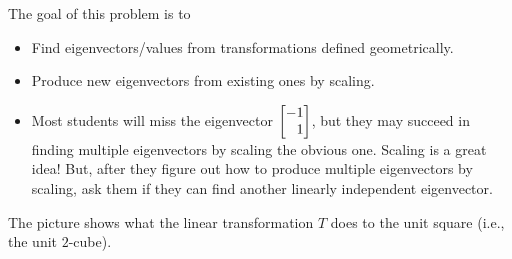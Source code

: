 	\question
	\begin{annotation}
		\begin{goals}

			The goal of this problem is to
			\begin{itemize}
				\item Find eigenvectors/values from transformations defined geometrically.
				\item Produce new eigenvectors from existing ones by scaling.
			\end{itemize}
		\end{goals}

		\begin{notes}
			\begin{itemize}
				\item Most students will miss the eigenvector $\mat{-1\\1}$, but they
					may succeed in finding multiple eigenvectors by scaling the obvious one.
					Scaling is a great idea! But, after they figure out how to produce multiple
					eigenvectors by scaling, ask them if they can find another linearly independent
					eigenvector.
			\end{itemize}
		\end{notes}
	\end{annotation}
	The picture shows what the linear transformation $T$ does to the unit square (i.e., the unit $2$-cube).

